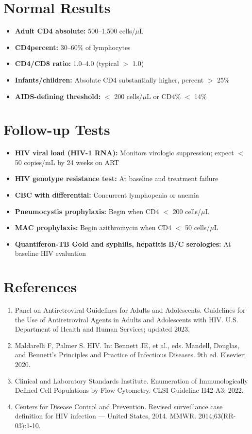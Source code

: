 \section*{Normal Results}
\begin{itemize}
  \item \textbf{Adult CD4 absolute:} 500--1,500 cells/$\mu$L
  \item \textbf{CD4percent:} 30--60\% of lymphocytes
  \item \textbf{CD4/CD8 ratio:} 1.0--4.0 (typical $>$ 1.0)
  \item \textbf{Infants/children:} Absolute CD4 substantially higher, percent $>$ 25\%
  \item \textbf{AIDS-defining threshold:} $<$ 200 cells/$\mu$L or CD4\% $<$ 14\%
\end{itemize}

\section*{Follow-up Tests}
\begin{itemize}
  \item \textbf{HIV viral load (HIV-1 RNA):} Monitors virologic suppression; expect $<$ 50 copies/mL by 24 weeks on ART
  \item \textbf{HIV genotype resistance test:} At baseline and treatment failure
  \item \textbf{CBC with differential:} Concurrent lymphopenia or anemia
  \item \textbf{Pneumocystis prophylaxis:} Begin when CD4 $<$ 200 cells/$\mu$L
  \item \textbf{MAC prophylaxis:} Begin azithromycin when CD4 $<$ 50 cells/$\mu$L
  \item \textbf{Quantiferon-TB Gold and syphilis, hepatitis B/C serologies:} At baseline HIV evaluation
\end{itemize}

\section*{References}
\begin{enumerate}
  \item Panel on Antiretroviral Guidelines for Adults and Adolescents. Guidelines for the Use of Antiretroviral Agents in Adults and Adolescents with HIV. U.S. Department of Health and Human Services; updated 2023.
  \item Maldarelli F, Palmer S. HIV. In: Bennett JE, et al., eds. Mandell, Douglas, and Bennett's Principles and Practice of Infectious Diseases. 9th ed. Elsevier; 2020.
  \item Clinical and Laboratory Standards Institute. Enumeration of Immunologically Defined Cell Populations by Flow Cytometry. CLSI Guideline H42-A3; 2022.
  \item Centers for Disease Control and Prevention. Revised surveillance case definition for HIV infection --- United States, 2014. MMWR. 2014;63(RR-03):1-10.
\end{enumerate}

\clearpage